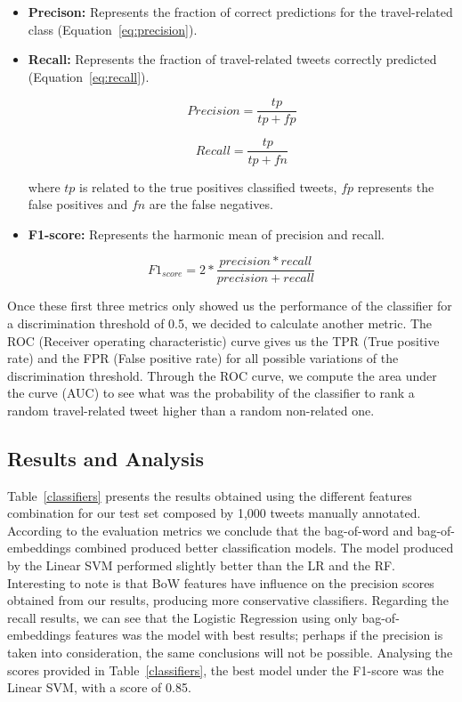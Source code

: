 \begin{itemize}
\item \textbf{Precison:} Represents the fraction of correct predictions for the travel-related class (Equation~\ref{eq:precision}).

\item \textbf{Recall:} Represents the fraction of travel-related tweets correctly predicted (Equation~\ref{eq:recall}).
\begin{multicols}{2}
	\begin{equation}\label{eq:precision}
		Precision = \frac{tp}{tp+fp}
    \end{equation}
    
	\begin{equation}\label{eq:recall}
		Recall = \frac{tp}{tp+fn}
	\end{equation}
\end{multicols}

where \textbf{$tp$} is related to the true positives classified tweets, \textbf{$fp$} represents the false positives and \textbf{$fn$} are the false negatives.

\item \textbf{F1-score:} Represents the harmonic mean of precision and recall.
\end{itemize}

\begin{equation}
{F1}_{score} = 2*\frac{precision*recall}{precision+recall}
\end{equation}

Once these first three metrics only showed us the performance of the classifier for a discrimination threshold of 0.5, we decided to calculate another metric. The ROC (Receiver operating characteristic) curve gives us the TPR (True positive rate) and the FPR (False positive rate) for all possible variations of the discrimination threshold. Through the ROC curve, we compute the area under the curve (AUC) to see what was the probability of the classifier to rank a random travel-related tweet higher than a random non-related one.

\subsection{Results and Analysis}
Table~\ref{classifiers} presents the results obtained using the different features combination for our test set composed by 1,000 tweets manually annotated. According to the evaluation metrics we conclude that the bag-of-word and bag-of-embeddings combined produced better classification models. The model produced by the Linear SVM performed slightly better than the LR and the RF. Interesting to note is that BoW features have influence on the precision scores obtained from our results, producing more conservative classifiers. Regarding the recall results, we can see that the Logistic Regression using only bag-of-embeddings features was the model with best results; perhaps if the precision is taken into consideration, the same conclusions will not be possible. Analysing the scores provided in Table~\ref{classifiers}, the best model under the F1-score was the Linear SVM, with a score of 0.85.

